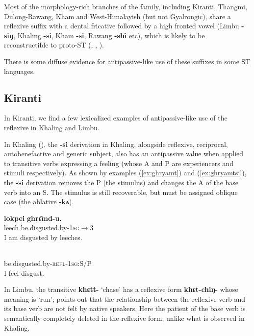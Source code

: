 \documentclass[oneside,a4paper,11pt]{article}
\newcommand{\ipa}[1]{{\phon\textbf{#1}}}
\begin{document}
Most of the morphology-rich branches of the family, including Kiranti, Thangmi, Dulong-Rawang, Kham and West-Himalayish (but not Gyalrongic), share a reflexive suffix with a dental fricative followed by a high fronted vowel (Limbu \ipa{-siŋ}, Khaling \ipa{-si}, Kham \ipa{-si}, Rawang \ipa{-shì} etc), which is likely to be reconstructible to proto-ST (\citealt[94]{bauman75}, \citealt[320]{driem93agreement}, \citealt{jacques16ssuffixes}).

There is some diffuse evidence for antipassive-like use of these suffixes in some ST languages.

\subsection{Kiranti} \label{sec:kiranti.si}
In Kiranti, we find a few lexicalized examples of antipassive-like use of the reflexive in Khaling and Limbu.

In Khaling (\citealt{jacques16si}), the \ipa{-si} derivation in Khaling, alongside reflexive, reciprocal, autobenefactive and generic subject, also has an antipassive value when applied to transitive verbs expressing a feeling (whose A and P are experiencers and stimuli respectively). As shown by examples (\ref{ex:ghryamt})  and (\ref{ex:ghryamtsi}), the \ipa{-si} derivation removes the P (the stimulus) and changes the A of the base verb into an S. The stimulus is still recoverable, but must be assigned oblique case (the ablative \ipa{-kʌ}).  

\begin{exe}
\ex \label{ex:ghryamt} 
\gll 
  	\ipa{lokpei}  	\ipa{ghrɛ̄md-u.}  \\
leech  be.disgusted.by-\textsc{1sg$\rightarrow$3} \\
 \glt  I am disgusted by leeches.
\end{exe}

\begin{exe}
\ex \label{ex:ghryamtsi} 
\gll \ipa{gʰrɛ̄m-si-ŋʌ}\\
 be.disgusted.by-\textsc{refl-1sg:S/P} \\
\glt  I feel disgust.
\end{exe}

In Limbu,  the transitive \ipa{khɛtt-} `chase' has a reflexive form \ipa{khɛt-chiŋ-} whose meaning is `run'; \citet[87]{driem87} points out that the relationship between the reflexive verb and its base verb are not felt by native speakers. Here the patient of the base verb is semantically completely deleted in the reflexive form, unlike what is observed in Khaling.
\end{document}
